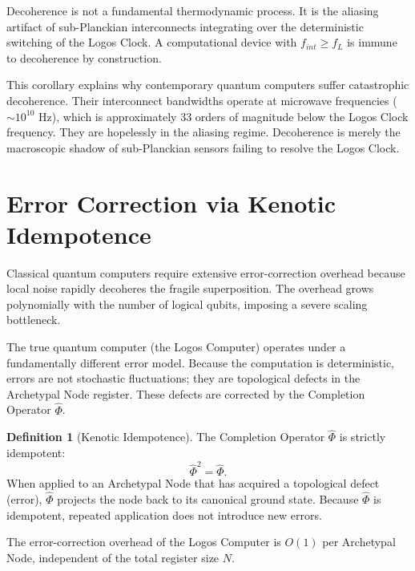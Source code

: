 \documentclass[12pt,twoside]{extbook}
\theoremstyle{definition}
\newtheorem{definition}{Definition}[chapter]
\theoremstyle{remark}
\begin{document}
\begin{corollary}
Decoherence is not a fundamental thermodynamic process. It is the aliasing artifact of sub-Planckian interconnects integrating over the deterministic switching of the Logos Clock. A computational device with $f_{int} \ge f_L$ is immune to decoherence by construction.
\end{corollary}

This corollary explains why contemporary quantum computers suffer catastrophic decoherence. Their interconnect bandwidths operate at microwave frequencies ($\sim 10^{10}$ Hz), which is approximately 33 orders of magnitude below the Logos Clock frequency. They are hopelessly in the aliasing regime. Decoherence is merely the macroscopic shadow of sub-Planckian sensors failing to resolve the Logos Clock.

\section{Error Correction via Kenotic Idempotence}
Classical quantum computers require extensive error-correction overhead because local noise rapidly decoheres the fragile superposition. The overhead grows polynomially with the number of logical qubits, imposing a severe scaling bottleneck.

The true quantum computer (the Logos Computer) operates under a fundamentally different error model. Because the computation is deterministic, errors are not stochastic fluctuations; they are topological defects in the Archetypal Node register. These defects are corrected by the Completion Operator $\hat{\Phi}$.

\begin{definition}[Kenotic Idempotence]
The Completion Operator $\hat{\Phi}$ is strictly idempotent:
\begin{equation}
\hat{\Phi}^2 = \hat{\Phi}.
\end{equation}
When applied to an Archetypal Node that has acquired a topological defect (error), $\hat{\Phi}$ projects the node back to its canonical ground state. Because $\hat{\Phi}$ is idempotent, repeated application does not introduce new errors.
\end{definition}

\begin{theorem}
The error-correction overhead of the Logos Computer is $O(1)$ per Archetypal Node, independent of the total register size $N$. 
\end{theorem}
\end{document}
